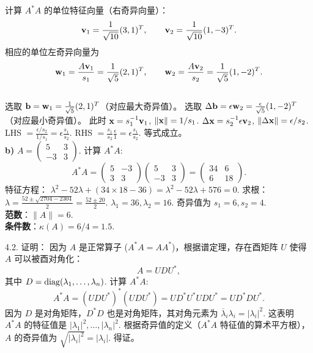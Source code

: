 \begin{exer}
计算 $A^*A$ 的单位特征向量（右奇异向量）：
$$\mathbf{v}_1=\frac{1}{\sqrt{10}}(3,1)^T,\qquad \mathbf{v}_2=\frac{1}{\sqrt{10}}(1,-3)^T.$$
相应的单位左奇异向量为
$$\mathbf{w}_1=\frac{A\mathbf{v}_1}{s_1}=\frac{1}{\sqrt5}(2,1)^T,\qquad
\mathbf{w}_2=\frac{A\mathbf{v}_2}{s_2}=\frac{1}{\sqrt5}(1,-2)^T.$$
\\
选取 $\mathbf{b} = \mathbf{w}_1 = \frac{1}{\sqrt{5}}(2, 1)^T$（对应最大奇异值）。
选取 $\Delta \mathbf{b} = \epsilon \mathbf{w}_2 = \frac{\epsilon}{\sqrt{5}}(1, -2)^T$（对应最小奇异值）。
此时 $\mathbf{x} = s_1^{-1} \mathbf{v}_1$, $\|\mathbf{x}\| = 1/s_1$.
$\Delta \mathbf{x} = s_2^{-1} \epsilon \mathbf{v}_2$, $\|\Delta \mathbf{x}\| = \epsilon/s_2$.
LHS $= \frac{\epsilon/s_2}{1/s_1} = \epsilon \frac{s_1}{s_2}$.
RHS $= \frac{s_1}{s_2} \frac{\epsilon}{1} = \epsilon \frac{s_1}{s_2}$.
等式成立。
\\
\textbf{b)} $A = \begin{pmatrix} 5 & 3 \\ -3 & 3 \end{pmatrix}$.
计算 $A^*A$:
$$ A^*A = \begin{pmatrix} 5 & -3 \\ 3 & 3 \end{pmatrix} \begin{pmatrix} 5 & 3 \\ -3 & 3 \end{pmatrix} = \begin{pmatrix} 34 & 6 \\ 6 & 18 \end{pmatrix}. $$
特征方程：
$\lambda^2 - 52\lambda + (34 \times 18 - 36) = \lambda^2 - 52\lambda + 576 = 0$.
求根：$\lambda = \frac{52 \pm \sqrt{2704 - 2304}}{2} = \frac{52 \pm 20}{2}$.
$\lambda_1 = 36, \lambda_2 = 16$.
奇异值为 $s_1 = 6, s_2 = 4$.\\
\textbf{范数}：$\|A\| = 6$.\\
\textbf{条件数}：$\kappa(A) = 6/4 = 1.5$.

4.2. 证明：
因为 $A$ 是正常算子 ($A^*A = AA^*$)，根据谱定理，存在酉矩阵 $U$ 使得 $A$ 可以被酉对角化：
$$ A = U D U^*, $$
其中 $D = \operatorname{diag}(\lambda_1, \dots, \lambda_n)$.
计算 $A^*A$:
$$ A^*A = (U D U^*)^* (U D U^*) = U D^* U^* U D U^* = U D^* D U^*. $$
因为 $D$ 是对角矩阵，$D^* D$ 也是对角矩阵，其对角元素为 $\overline{\lambda}_i \lambda_i = |\lambda_i|^2$.
这表明 $A^*A$ 的特征值是 $|\lambda_1|^2, \dots, |\lambda_n|^2$.
根据奇异值的定义（$A^*A$ 特征值的算术平方根），$A$ 的奇异值为 $\sqrt{|\lambda_i|^2} = |\lambda_i|$.
得证。


\end{exer}
